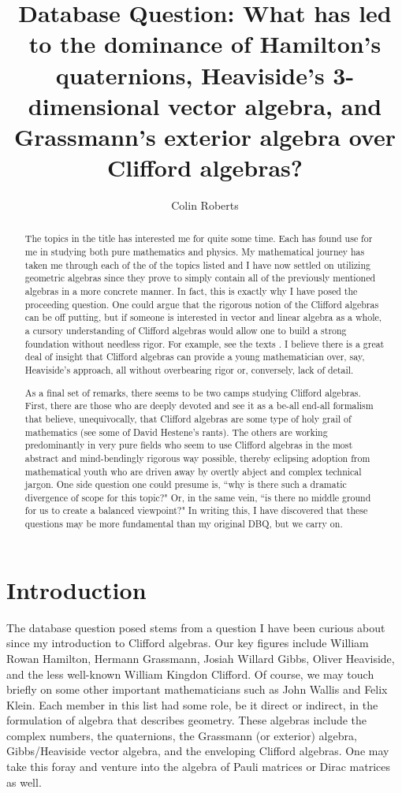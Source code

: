 \documentclass[12pt]{article}
\title{Database Question: What has led to the dominance of Hamilton's quaternions, Heaviside's 3-dimensional vector algebra, and Grassmann's exterior algebra over Clifford algebras?}
\author{Colin Roberts}
\begin{document}
 \begin{titlingpage}
     \maketitle
     \vfill
     \begin{abstract}
        The topics in the title has interested me for quite some time. Each has found use for me in studying both pure mathematics and physics. My mathematical journey has taken me through each of the  of the topics listed and I have now settled on utilizing geometric algebras since they prove to simply contain all of the previously mentioned algebras in a more concrete manner. In fact, this is exactly why I have posed the proceeding question. One could argue that the rigorous notion of the Clifford algebras can be off putting, but if someone is interested in vector and linear algebra as a whole, a cursory understanding of Clifford algebras would allow one to build a strong foundation without needless rigor. For example, see the texts \cite{doran_lasenby_2013,chisolm_geometric_2012}. I believe there is a great deal of insight that Clifford algebras can provide a young mathematician over, say, Heaviside's approach, all without overbearing rigor or, conversely, lack of detail.

        As a final set of remarks, there seems to be two camps studying Clifford algebras. First, there are those who are deeply devoted and see it as a be-all end-all formalism that believe, unequivocally, that Clifford algebras are some type of holy grail of mathematics (see some of David Hestene's rants). The others are working predominantly in very pure fields who seem to use Clifford algebras in the most abstract and mind-bendingly rigorous way possible, thereby eclipsing adoption from mathematical youth who are driven away by overtly abject and complex technical jargon. One side question one could presume is, ``why is there such a dramatic divergence of scope for this topic?" Or, in the same vein, ``is there no middle ground for us to create a balanced viewpoint?" In writing this, I have discovered that these questions may be more fundamental than my original DBQ, but we carry on.
     \end{abstract}
 \end{titlingpage}


\section{Introduction}
The database question posed stems from a question I have been curious about since my introduction to Clifford algebras. Our key figures include William Rowan Hamilton, Hermann Grassmann, Josiah Willard Gibbs, Oliver Heaviside, and the less well-known William Kingdon Clifford. Of course, we may touch briefly on some other important mathematicians such as John Wallis and Felix Klein. Each member in this list had some role, be it direct or indirect, in the formulation of algebra that describes geometry. These algebras include the complex numbers, the quaternions, the Grassmann (or exterior) algebra, Gibbs/Heaviside vector algebra, and the enveloping Clifford algebras. One may take this foray and venture into the algebra of Pauli matrices or Dirac matrices as well.
\end{document}
